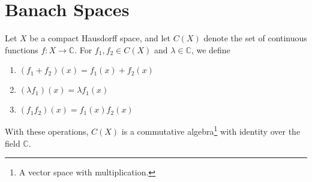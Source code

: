 \documentclass[12pt]{extarticle}
\newcommand{\C}{\mathbb{C}}
\theoremstyle{plain}
\theoremstyle{definition}
\theoremstyle{note}
\renewcommand{\newline}{\hfill\break}
\begin{document}
\section{Banach Spaces}%
Let $X$ be a compact Hausdorff space, and let $C(X)$ denote the set of continuous functions $f: X\rightarrow \C$. For $f_1,f_2\in C(X)$ and $\lambda\in \C$, we define
\begin{enumerate}[(1)]
  \item $\displaystyle \left(f_1 + f_2\right)(x) = f_1(x) + f_2(x)$
  \item $\displaystyle \left(\lambda f_1\right)(x) = \lambda f_1(x)$
  \item $\displaystyle \left(f_1f_2\right)(x) = f_1(x)f_2(x)$
\end{enumerate}
With these operations, $C(X)$ is a commutative algebra\footnote{A vector space with multiplication.} with identity over the field $\C$.\newline
\end{document}
